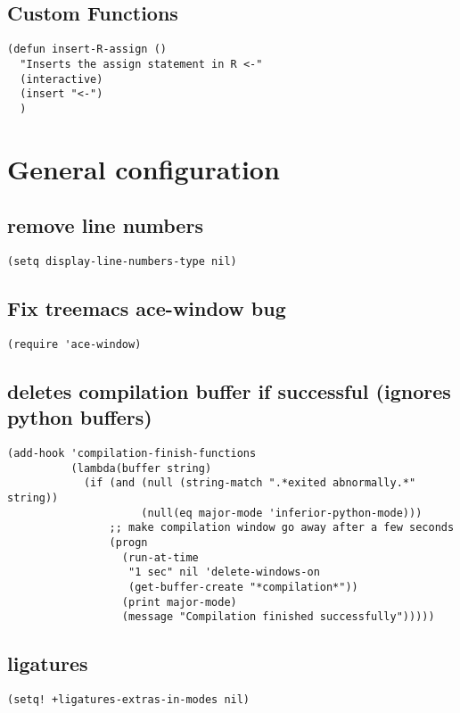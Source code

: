 \documentclass{assignments}
\begin{document}
\subsection*{Custom Functions}
\label{sec:orga18b5dd}
\begin{verbatim}
(defun insert-R-assign ()
  "Inserts the assign statement in R <-"
  (interactive)
  (insert "<-")
  )
\end{verbatim}

\section*{General configuration}
\label{sec:orga901da2}
\subsection*{remove line numbers}
\label{sec:org873017e}
\begin{verbatim}
(setq display-line-numbers-type nil)
\end{verbatim}
\subsection*{Fix treemacs ace-window bug}
\label{sec:org4c07dba}
\begin{verbatim}
(require 'ace-window)
\end{verbatim}
\subsection*{deletes compilation buffer if successful (ignores python buffers)}
\label{sec:org95fc10d}
\begin{verbatim}
(add-hook 'compilation-finish-functions
          (lambda(buffer string)
            (if (and (null (string-match ".*exited abnormally.*" string))
                     (null(eq major-mode 'inferior-python-mode)))
                ;; make compilation window go away after a few seconds
                (progn
                  (run-at-time
                   "1 sec" nil 'delete-windows-on
                   (get-buffer-create "*compilation*"))
                  (print major-mode)
                  (message "Compilation finished successfully")))))
\end{verbatim}
\subsection*{ligatures}
\label{sec:orgb1c9cd2}
\begin{verbatim}
(setq! +ligatures-extras-in-modes nil)
\end{verbatim}
\end{document}
